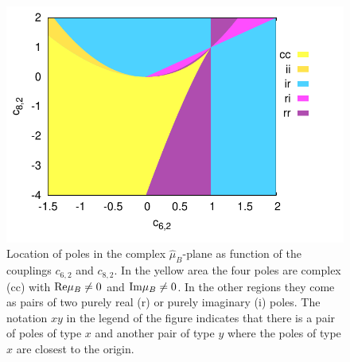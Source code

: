 \documentclass[pdflatex,prd,twocolumn,showpacs,superscriptaddress,nofootinbib]{revtex4-1}
\newcommand \hmu {\hat{\mu}}
\begin{document}
\begin{figure}[t]
	\begin{center}
\includegraphics[scale=0.65]{fig/c8c6diagram.pdf}
\end{center}
\vspace{-0.5cm}
\caption{Location of poles in
the complex $\hmu_B$-plane as function of the couplings $c_{6,2}$
and $c_{8,2}$. In the yellow area the four poles are
complex (cc) with ${\rm Re}\mu_B \ne 0$ and ${\rm Im}\mu_B \ne 0$. In the other regions they come as pairs of two purely real (r) or purely imaginary (i) poles.
The notation $xy$ in the legend of the figure indicates that there
is a pair of poles of type $x$ and another pair of type $y$ where the poles of type $x$ are closest to the origin.}
\label{fig:poles}
\end{figure}
 

\end{document}
